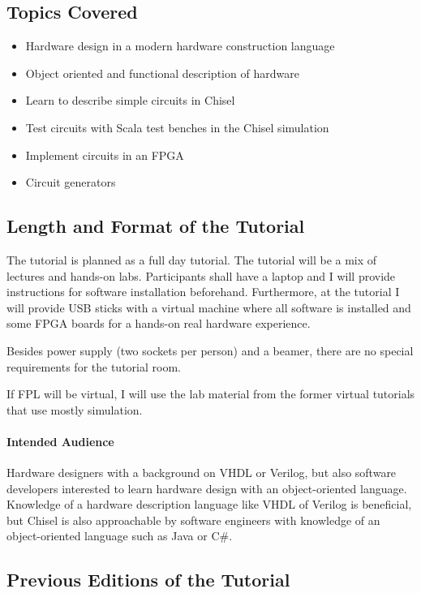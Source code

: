 \documentclass{article}
\begin{document}
\subsection*{Topics Covered}

\begin{itemize}
\item Hardware design in a modern hardware construction language
\item Object oriented and functional description of hardware
\item Learn to describe simple circuits in Chisel
\item Test circuits with Scala test benches in the Chisel simulation
\item Implement circuits in an FPGA
\item Circuit generators
\end{itemize}

\subsection*{Length and Format of the Tutorial}

The tutorial is planned as a full day tutorial.
The tutorial will be a mix of lectures and hands-on labs. Participants shall have a laptop and I will provide
instructions for software installation beforehand. Furthermore, at the tutorial I will provide USB sticks
with a virtual machine where all software is installed and some FPGA boards for a hands-on real
hardware experience.

Besides power supply (two sockets per person) and a beamer, there are no special requirements for the tutorial room.

If FPL will be virtual, I will use the lab material from the former virtual tutorials that use mostly simulation.

\paragraph{Intended Audience}

Hardware designers with a background on VHDL or Verilog, but also software developers
interested to learn hardware design with an object-oriented language.
Knowledge of a hardware description language like VHDL of Verilog is beneficial, but Chisel is also
approachable by software engineers with knowledge of an object-oriented language such as Java or C\#.
 

\subsection*{Previous Editions of the Tutorial}
\end{document}

